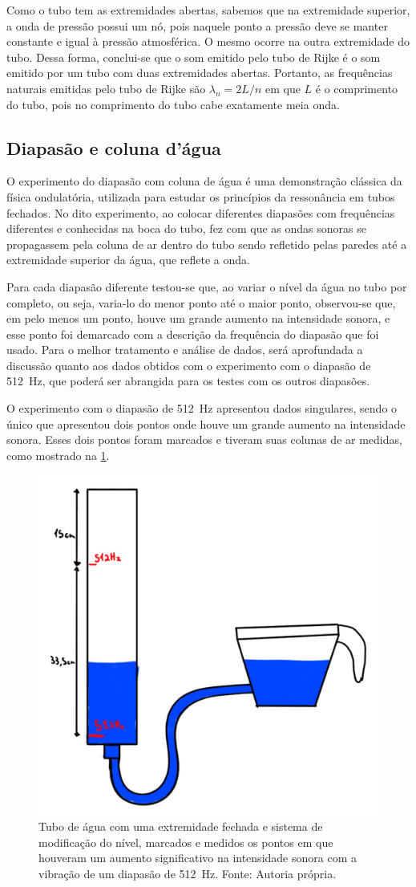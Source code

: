 Como o tubo tem as extremidades abertas, sabemos que na extremidade superior, a onda de pressão possui um nó, pois naquele ponto a pressão deve se manter constante e igual à pressão atmosférica. O mesmo ocorre na outra extremidade do tubo. Dessa forma, conclui-se que o som emitido pelo tubo de Rijke é o som emitido por um tubo com duas extremidades abertas. Portanto, as frequências naturais emitidas pelo tubo de Rijke são \(\lambda_n = 2L/n\) em que \(L\) é o comprimento do tubo, pois no comprimento do tubo cabe exatamente meia onda. 

\subsection{Diapasão e coluna d'água}
O experimento do diapasão com coluna de água é uma demonstração clássica da física ondulatória, utilizada para estudar os princípios da ressonância em tubos fechados. No dito experimento, ao colocar diferentes diapasões com frequências diferentes e conhecidas na boca do tubo, fez com que as ondas sonoras se propagassem pela coluna de ar dentro do tubo sendo refletido pelas paredes até a extremidade superior da água, que reflete a onda. 

Para cada diapasão diferente testou-se que, ao variar o nível da água no tubo por completo, ou seja, varia-lo do menor ponto até o maior ponto, observou-se que, em pelo menos um ponto, houve um grande aumento na intensidade sonora, e esse ponto foi demarcado com a descrição da frequência do diapasão que foi usado. Para o melhor tratamento e análise de dados, será aprofundada a discussão quanto aos dados obtidos com o experimento com o diapasão de \qty{512}{Hz}, que poderá ser abrangida para os testes com os outros diapasões.

O experimento com o diapasão de \qty{512}{Hz} apresentou dados singulares, sendo o único que apresentou dois pontos onde houve um grande aumento na intensidade sonora.  Esses dois pontos foram marcados e tiveram suas colunas de ar medidas, como mostrado na \cref{TuboFechado}.
\begin{figure}[H]
	\centering
	\includegraphics[width=0.35\linewidth]{fig/TuboFechado.png}
	\caption{Tubo de água com uma extremidade fechada e sistema de modificação do nível, marcados e medidos os pontos em que houveram um aumento significativo na intensidade sonora com a vibração de um diapasão de \qty{512}{Hz}. Fonte: Autoria própria.}
	\label{TuboFechado}
\end{figure}

